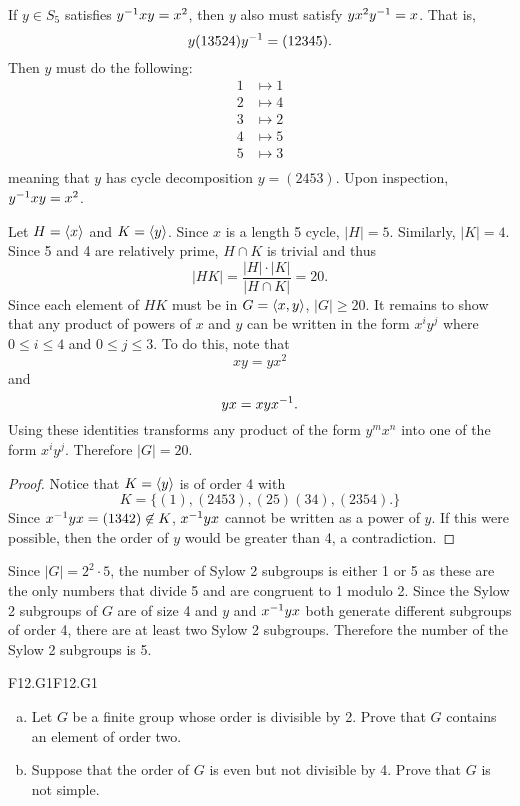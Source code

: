 \documentclass[../AlgebraQualSolutions.tex]{subfiles}
\begin{document}
	\begin{solution}
		If $y \in S_5$ satisfies  $y^{-1} xy = x^2$, then $y$ also must satisfy $yx^2y^{-1} = x$. That is,
			\[y(13524)y^{-1} = (12345).\]
		Then $y$ must do the following:
			\begin{align*}
				1 &\mapsto 1\\
				2 &\mapsto 4\\
				3 &\mapsto 2\\
				4 &\mapsto 5\\
				5 &\mapsto 3\\
			\end{align*}
		meaning that $y$ has cycle decomposition $y = (2453)$. Upon inspection, $y^{-1} x y = x^2$.
	\end{solution}

	\begin{solution}
		Let $H = \left\langle x \right\rangle$ and $K = \left\langle y \right\rangle$. Since $x$ is a length 5 cycle, $|H| = 5$. Similarly, $|K| = 4$. Since 5 and 4 are relatively prime, $H \cap K$ is trivial and thus
			\[|HK| = \frac{|H|\cdot|K|}{|H \cap K|} = 20. \]
		Since each element of $HK$ must be in $G = \left\langle x,y \right\rangle$, $|G| \geq 20$. It remains to show that any product of powers of $x$ and $y$ can be written  in the form $x^iy^j$ where $0 \leq i \leq 4$ and  $0 \leq j \leq 3$. To do this, note that
			\[xy = yx^2\]
		and
			\[yx = xyx^{-1}.\]
		Using these identities transforms any product of the form $y^mx^n$ into one of the form $x^iy^j$. Therefore $|G| = 20$.
	\end{solution}

	\begin{proof}
		Notice that $K = \left\langle y \right\rangle$ is of order 4 with
			\[K = \{(1), (2453), (25)(34), (2354).\}\]
		Since $x^{-1} y x = (1342) \not\in K$, $x^{-1} y x$ cannot be written as a power of $y$. If this were possible, then the order of $y$ would be greater than 4, a contradiction.
	\end{proof}

	\begin{solution}
		Since $|G| = 2^2 \cdot 5$, the number of Sylow 2 subgroups is either 1 or 5 as these are the only numbers that divide 5 and are congruent to 1 modulo 2. Since the Sylow 2 subgroups of $G$ are of size 4 and $y$ and $x^{-1} y x$ both generate different subgroups of order 4, there are at least two Sylow 2 subgroups. Therefore the number of the Sylow 2 subgroups is 5.
	\end{solution}

	\begin{prob}{F12.G1}{F12.G1}
	\begin{enumerate}[(a)]
	\item Let $G$ be a finite group whose order is divisible by 2. Prove that $G$ contains an element of order two.
	\item Suppose that the order of $G$ is even but not divisible by 4. Prove that $G$ is not simple.
	\end{enumerate}
	\end{prob}
	
\end{document}
